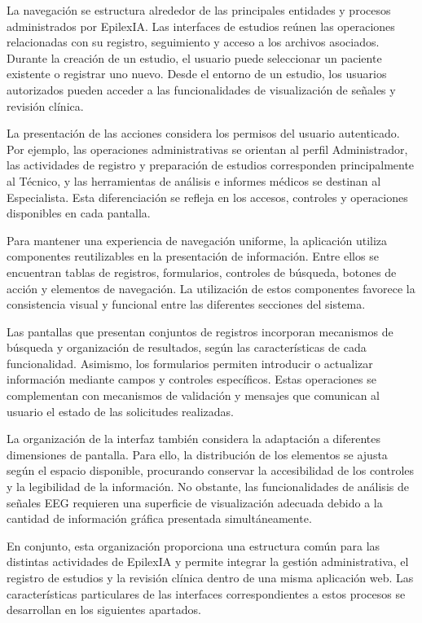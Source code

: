 La navegación se estructura alrededor de las principales entidades y procesos administrados por EpilexIA. Las interfaces de estudios reúnen las operaciones relacionadas con su registro, seguimiento y acceso a los archivos asociados. Durante la creación de un estudio, el usuario puede seleccionar un paciente existente o registrar uno nuevo. Desde el entorno de un estudio, los usuarios autorizados pueden acceder a las funcionalidades de visualización de señales y revisión clínica.

La presentación de las acciones considera los
permisos del usuario autenticado. Por ejemplo,
las operaciones administrativas se orientan al
perfil Administrador, las actividades de registro
y preparación de estudios corresponden principalmente
al Técnico, y las herramientas de análisis e
informes médicos se destinan al Especialista.
Esta diferenciación se refleja en los accesos,
controles y operaciones disponibles en cada pantalla.

Para mantener una experiencia de navegación
uniforme, la aplicación utiliza componentes
reutilizables en la presentación de información.
Entre ellos se encuentran tablas de registros,
formularios, controles de búsqueda, botones
de acción y elementos de navegación. La utilización
de estos componentes favorece la consistencia
visual y funcional entre las diferentes secciones
del sistema.

Las pantallas que presentan conjuntos de registros
incorporan mecanismos de búsqueda y organización
de resultados, según las características de cada
funcionalidad. Asimismo, los formularios permiten
introducir o actualizar información mediante
campos y controles específicos. Estas operaciones
se complementan con mecanismos de validación
y mensajes que comunican al usuario el estado
de las solicitudes realizadas.

La organización de la interfaz también considera
la adaptación a diferentes dimensiones de pantalla.
Para ello, la distribución de los elementos se
ajusta según el espacio disponible, procurando
conservar la accesibilidad de los controles y
la legibilidad de la información. No obstante,
las funcionalidades de análisis de señales EEG
requieren una superficie de visualización adecuada
debido a la cantidad de información gráfica
presentada simultáneamente.

En conjunto, esta organización proporciona
una estructura común para las distintas actividades
de EpilexIA y permite integrar la gestión
administrativa, el registro de estudios y la
revisión clínica dentro de una misma aplicación
web. Las características particulares de las
interfaces correspondientes a estos procesos
se desarrollan en los siguientes apartados.


